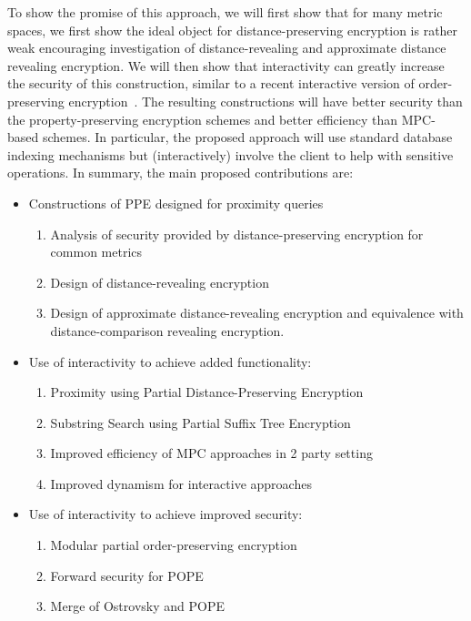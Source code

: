 To show the promise of this approach, we will first show that for many metric
spaces, we first show the ideal object for distance-preserving encryption is rather weak encouraging investigation of distance-revealing and approximate distance revealing encryption.  We will then show that interactivity can greatly increase the security of this construction, similar to a recent interactive version of order-preserving encryption~\cite{CCS:RACY16}. The resulting constructions will have
better security than the property-preserving encryption schemes and better
efficiency than MPC-based schemes. In particular, the proposed approach will
use standard database indexing mechanisms but (interactively) involve the
client to help with sensitive operations. 
In summary, the main proposed contributions are:
\begin{itemize}
\item Constructions of PPE designed for proximity queries
\begin{enumerate}
\item Analysis of security provided by distance-preserving encryption for common metrics
\item Design of distance-revealing encryption
\item Design of approximate distance-revealing encryption and equivalence with distance-comparison revealing encryption.
\end{enumerate}
\item Use of interactivity to achieve added functionality:
\begin{enumerate}
\item Proximity using Partial Distance-Preserving Encryption
\item Substring Search using Partial Suffix Tree Encryption
\item Improved efficiency of MPC approaches in 2 party setting
\item Improved dynamism for interactive approaches
\end{enumerate}
\item Use of interactivity to achieve improved security:
\begin{enumerate}
\item Modular partial order-preserving encryption
\item Forward security for POPE
\item Merge of Ostrovsky and POPE
\end{enumerate}
\end{itemize}


